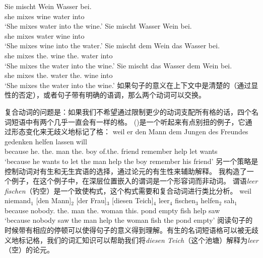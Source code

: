 \eal
\ex 
\gll Sie mischt Wein Wasser bei.\\
     she mixes wine water into\\
\glt `She mixes water into the wine.'
\ex 
\gll Sie mischt Wasser Wein bei.\\
     she mixes water wine into\\
\glt `She mixes wine into the water.'
\ex 
\gll Sie mischt dem Wein das Wasser bei.\\
     she mixes the.\dat{} wine the.\acc{} water into\\
\glt `She mixes the water into the wine.'
\ex 
\gll Sie mischt das Wasser dem Wein bei.\\
	she mixes the.\acc{} water the.\dat{} wine into\\
\glt `She mixes the water into the wine.'
\zl
如果句子的意义在上下文中是清楚的（\eg 通过显性的否定），或者句子带有明确的语调，那么两个动词可以交换。

复合动词的问题是：如果我们不希望通过限制更少的动词支配所有格的话，四个名词短语中有两个几乎一直会有一样的格。
()是一个听起来有点别扭的例子，它通过形态变化来无歧义地标记了格：
\ea
\gll weil    er        den        Mann dem        Jungen des Freundes gedenken helfen lassen will\\
     because he.\nom{} the.\acc{} man  the.\dat{} boy    of.the.\gen{} friend remember help let wants\\
\glt `because he wants to let the man help the boy remember his friend'
\z
另一个策略是控制动词对有生和无生宾语的选择，通过论元的有生性来辅助解释。
我构造了一个例子，在这个例子中，在深层位置嵌入的谓词是一个形容词而非动词。
谓语\emph{leer fischen}（钓空）是一个致使构式，这个构式需要和复合动词进行类比分析\citep[Chapter~5]{Mueller2002b}。
\ea
\gll weil niemand$_1$ [den Mann]$_2$ [der Frau]$_3$ [diesen Teich]$_4$  leer$_4$ fischen$_3$ helfen$_2$ sah$_1$\\
     because nobody.\nom{} \spacebr{}the.\acc{} man \spacebr{}the.\dat{} woman \spacebr{}this.\acc{} pond empty fish help saw\\
\glt `because nobody saw the man help the woman fish the pond empty'
\z
阅读句子的时候带有相应的停顿可以使得句子的意义得到理解。有生的名词短语格可以被无歧义地标记格，我们的词汇知识可以帮助我们将\emph{diesen Teich}（这个池塘）解释为\emph{leer}（空）的论元。 

